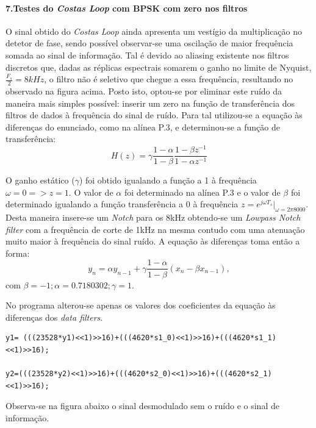 \documentclass[11pt]{article}
\numberwithin{equation}{section}
\begin{document}
\paragraph{7.Testes do \textit{Costas Loop} com BPSK com zero nos filtros} \hspace{0pt} \label{para:P3-7}

O sinal obtido do \textit{Costas Loop} ainda apresenta um vestígio da multiplicação no detetor de fase, sendo possível observar-se uma oscilação de maior frequência somada ao sinal de informação. Tal é devido ao aliasing existente nos filtros discretos que, dadas as réplicas espectrais somarem o ganho no limite de Nyquist, $\frac{F_s}{2} = 8kHz$, o filtro  não é seletivo que chegue a essa frequência, resultando no observado na figura acima. Posto isto, optou-se por eliminar este ruído da maneira mais simples possível: inserir um zero na função de transferência dos filtros de dados à frequência do sinal de ruído. Para tal utilizou-se a equação às diferenças do enunciado, como na alínea P.3, e determinou-se a função de transferência:
\begin{equation}
H(z) = \gamma\frac{1-\alpha}{1-\beta}\dfrac{1-\beta z^{-1}}{1-\alpha z^{-1}}
\end{equation}

O ganho estático ($\gamma$) foi obtido igualando a função a 1 à frequência $\omega=0 => z=1$. O valor de $\alpha$ foi determinado na alínea P.3 e o valor de $\beta$ foi determinado igualando a função transferência a 0 à frequência $z=e^{j\omega T_s}|_{\omega=2\pi8000}$. Desta maneira insere-se um \textit{Notch} para os 8kHz obtendo-se um \textit{Lowpass Notch filter} com a frequência de corte de 1kHz na mesma contudo com uma atenuação muito maior à frequência do sinal ruído.
A equação às diferenças toma então a forma:
\begin{equation}
y_n = \alpha y_{n-1}+\gamma\frac{1-\alpha}{1-\beta}(x_n-\beta x_{n-1}), 
\end{equation}
com $\beta=-1; \alpha=0.7180302; \gamma=1.$

No programa alterou-se apenas os valores dos coeficientes da equação às diferenças dos \textit{data filters}.

\begin{lstlisting}
y1= (((23528*y1)<<1)>>16)+(((4620*s1_0)<<1)>>16)+(((4620*s1_1)<<1)>>16);

y2=(((23528*y2)<<1)>>16)+(((4620*s2_0)<<1)>>16)+(((4620*s2_1)<<1)>>16);
\end{lstlisting}
Observa-se na figura abaixo o sinal desmodulado sem o ruído e o sinal de informação.
\end{document}
